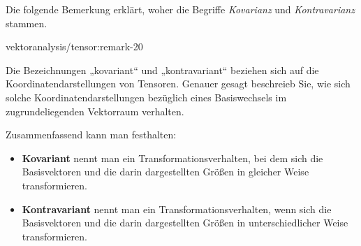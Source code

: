 \documentclass[letterpaper,10pt,german]{jupyterBook}
\begin{document}
\par
Die folgende Bemerkung erklärt, woher die Begriffe \emph{Kovarianz} und \emph{Kontravarianz} stammen.
\begin{remark}{}{vektoranalysis/tensor:remark-20}



\par
Die Bezeichnungen „kovariant“ und „kontravariant“ beziehen sich auf die Koordinatendarstellungen von Tensoren.
Genauer gesagt beschreieb Sie, wie sich solche Koordinatendarstellungen bezüglich eines Basiswechsels im zugrundeliegenden Vektorraum verhalten.

\par
Zusammenfassend kann man festhalten:
\begin{itemize}
\item {} 
\par
\textbf{Kovariant} nennt man ein Transformationsverhalten, bei dem sich die Basisvektoren und die darin dargestellten Größen in gleicher Weise transformieren.

\item {} 
\par
\textbf{Kontravariant} nennt man ein Transformationsverhalten, wenn sich die Basisvektoren und die darin dargestellten Größen in unterschiedlicher Weise transformieren.

\end{itemize}
\end{remark}
\end{document}
